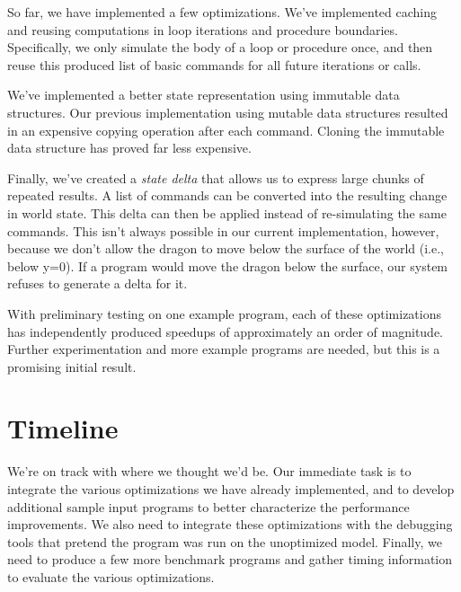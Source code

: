 \documentclass{sig-alternate}
\begin{document}
So far, we have implemented a few optimizations. We've implemented caching and reusing computations in loop iterations and procedure boundaries. Specifically, we only simulate the body of a loop or procedure once, and then reuse this produced list of basic commands for all future iterations or calls.  

We've implemented a better state representation using immutable data structures. Our previous implementation using mutable data structures resulted in an expensive copying operation after each command. Cloning the immutable data structure has proved far less expensive.

Finally, we've created a \emph{state delta} that allows us to express large chunks of repeated results. A list of commands can be converted into the resulting change in world state. This delta can then be applied instead of re-simulating the same commands. This isn't always possible in our current implementation, however, because we don't allow the dragon to move below the surface of the world (i.e., below y=0). If a program would move the dragon below the surface, our system refuses to generate a delta for it.

With preliminary testing on one example program, each of these optimizations has independently produced speedups of approximately an order of magnitude. Further experimentation and more example programs are needed, but this is a promising initial result.

\section*{Timeline}
We're on track with where we thought we'd be. Our immediate task is to integrate the various optimizations we have already implemented, and to develop additional sample input programs to better characterize the performance improvements. We also need to integrate these optimizations with the debugging tools that pretend the program was run on the unoptimized model. Finally, we need to produce a few more benchmark programs and gather timing information to evaluate the various optimizations.
\end{document}
